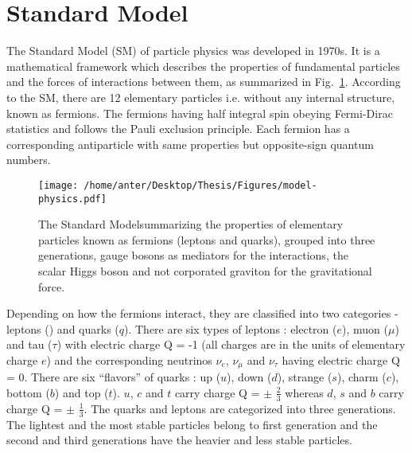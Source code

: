 \section{Standard Model}
The Standard Model (SM) of particle physics \cite{Perkins:1982xb,Herrero:1998eq,Weinberg:1967tq} was developed in 1970s. It is a mathematical framework which describes the properties of fundamental particles and the forces of interactions between them, as summarized in Fig.~\ref{fig:SM}. According to the SM, there are 12 elementary particles i.e. without any internal structure, known as fermions. The fermions having half integral spin obeying Fermi-Dirac statistics and follows the Pauli exclusion principle. Each fermion has a corresponding antiparticle with same properties but opposite-sign quantum numbers.
\begin{figure}[!h]
\begin{center}
\hspace*{-15mm}
\texttt{[image: /home/anter/Desktop/Thesis/Figures/model-physics.pdf]}\\
\caption[SM]{The Standard Model\footnotemark summarizing the properties of elementary particles known as fermions (leptons and quarks), grouped into three generations, gauge bosons as mediators for the interactions, the scalar Higgs boson and not corporated graviton for the gravitational force.}
\label{fig:SM}
\end{center}
\end{figure}
Depending on how the fermions interact, they are classified into two categories - leptons (\sln) and quarks ($q$). There are six types of leptons : electron ($e$), muon ($\mu$) and tau ($\tau$) with electric charge Q = -1 (all charges are in the units of elementary charge $e$) and the corresponding neutrinos $\nu_e$, $\nu_\mu$ and $\nu_\tau$ having electric charge Q = 0. There are six ``flavors'' of quarks : up ($u$), down ($d$), strange ($s$), charm ($c$), bottom ($b$) and top ($t$). $u$, $c$ and $t$ carry charge Q = $\pm$ $\frac{2}{3}$ whereas $d$, $s$ and $b$ carry charge Q = $\pm$ $\frac{1}{3}$. The quarks and leptons are categorized into three generations. The lightest and the most stable particles belong to first generation and the second and third generations have the heavier and less stable particles.

